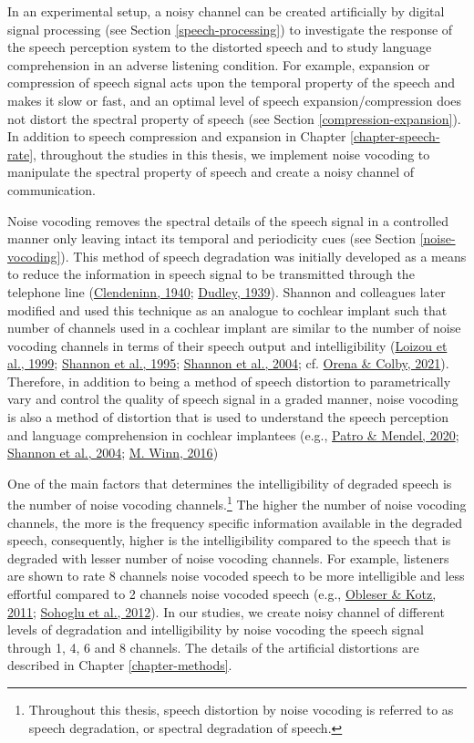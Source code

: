 \documentclass[a4paper, nobind]{templates/ociamthesis}
\begin{document}
In an experimental setup, a noisy channel can be created artificially by digital signal processing (see Section \ref{speech-processing}) to investigate the response of the speech perception system to the distorted speech
and to study language comprehension in an adverse listening condition.
For example, expansion or compression of speech signal acts upon the temporal property of the speech and makes it slow or fast, and an optimal level of speech expansion/compression does not distort the spectral property of speech (see Section \ref{compression-expansion}).
In addition to speech compression and expansion in Chapter \ref{chapter-speech-rate},
throughout the studies in this thesis, we implement noise vocoding to manipulate the spectral property of speech and create a noisy channel of communication.

Noise vocoding removes the spectral details of the speech signal in a controlled manner only leaving intact its temporal and periodicity cues (see Section \ref{noise-vocoding}).
This method of speech degradation was initially developed as a means to reduce the information in speech signal to be transmitted through the telephone line (\protect\hyperlink{ref-Vocoder1940}{Clendeninn, 1940}; \protect\hyperlink{ref-Dudley1939}{Dudley, 1939}).
Shannon and colleagues later modified and used this technique as an analogue to cochlear implant such that number of channels used in a cochlear implant are similar to the number of noise vocoding channels in terms of their speech output and intelligibility (\protect\hyperlink{ref-Loizou1999}{Loizou et al., 1999}; \protect\hyperlink{ref-Shannon1995}{Shannon et al., 1995}; \protect\hyperlink{ref-Shannon2004}{Shannon et al., 2004}; cf. \protect\hyperlink{ref-Orena2021}{Orena \& Colby, 2021}).
Therefore, in addition to being a method of speech distortion to parametrically vary and control the quality of speech signal in a graded manner,
noise vocoding is also a method of distortion that is used to understand the speech perception and language comprehension in cochlear implantees (e.g., \protect\hyperlink{ref-Patro2020}{Patro \& Mendel, 2020}; \protect\hyperlink{ref-Shannon2004}{Shannon et al., 2004}; \protect\hyperlink{ref-Winn2016}{M. Winn, 2016})

One of the main factors that determines the intelligibility of degraded speech is the number of noise vocoding channels.\footnote{Throughout this thesis, speech distortion by noise vocoding is referred to as speech degradation, or spectral degradation of speech.}
The higher the number of noise vocoding channels, the more is the frequency specific information available in the degraded speech,
consequently, higher is the intelligibility compared to the speech that is degraded with lesser number of noise vocoding channels.
For example, listeners are shown to rate 8 channels noise vocoded speech to be more intelligible and less effortful compared to 2 channels noise vocoded speech (e.g., \protect\hyperlink{ref-Obleser2011}{Obleser \& Kotz, 2011}; \protect\hyperlink{ref-Sohoglu2012}{Sohoglu et al., 2012}).
In our studies, we create noisy channel of different levels of degradation and intelligibility by noise vocoding the speech signal through 1, 4, 6 and 8 channels.
The details of the artificial distortions are described in Chapter \ref{chapter-methods}.
\end{document}
